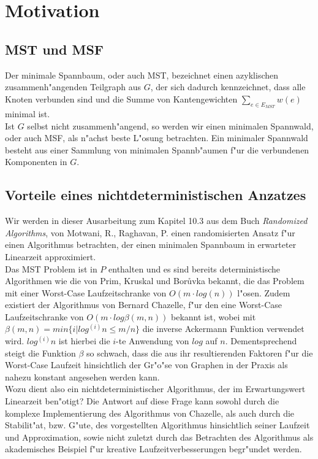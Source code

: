 \section{Motivation}

\subsection{MST und MSF}
Der minimale Spannbaum, oder auch MST, bezeichnet einen azyklischen 
    zusammenh"angenden Teilgraph aus $G$, der sich dadurch kennzeichnet, dass
    alle Knoten verbunden sind und
    die Summe von Kantengewichten $\sum_{e \in E_{MST}} w(e)$
    minimal ist.\\
Ist $G$ selbst nicht zusammenh"angend, so werden wir einen minimalen Spannwald,
    oder auch MSF,
    als n"achst beste L"osung betrachten.
    Ein minimaler Spannwald besteht aus einer Sammlung von minimalen 
    Spannb"aumen f"ur die verbundenen Komponenten in $G$.\\

\subsection{Vorteile eines nichtdeterministischen Anzatzes}

Wir werden in dieser Ausarbeitung zum Kapitel 10.3 aus dem Buch
    \textit{Randomized Algorithms}, von 
    Motwani, R., Raghavan, P.
    \cite{randAlg}
    einen
    randomisierten Ansatz f"ur einen Algorithmus betrachten, 
    der einen minimalen Spannbaum
    in erwarteter Linearzeit approximiert.\\
Das MST Problem ist in $P$ enthalten und es sind bereits 
    deterministische Algorithmen wie die von
    Prim, Kruskal und Bor\r uvka bekannt, 
    die das Problem mit einer Worst-Case Laufzeitschranke 
    von $O(m \cdot log(n))$ l"osen.
    Zudem existiert der Algorithmus von Bernard Chazelle, f"ur den eine
    Worst-Case Laufzeitschranke von $O(m \cdot log \beta(m,n))$ bekannt ist, wobei
    mit
    $\beta(m,n) = min\{i | log^{(i)} n \leq m / n\}$ die inverse Ackermann Funktion
    verwendet wird. 
    $log^{(i)} n$ ist hierbei die $i$-te Anwendung von $log$ auf $n$.
    Dementsprechend steigt die Funktion $\beta$ so schwach, dass die
    aus ihr resultierenden Faktoren f"ur die Worst-Case Laufzeit hinsichtlich
    der Gr"o"se von Graphen in der Praxis als nahezu konstant angesehen werden 
    kann.\\
Wozu dient also ein nichtdeterministischer Algorithmus, der im Erwartungswert 
    Linearzeit ben"otigt?
    Die Antwort auf diese Frage kann sowohl durch die komplexe Implementierung
    des Algorithmus von Chazelle, als auch durch die Stabilit"at, bzw. G"ute,
    des vorgestellten Algorithmus hinsichtlich seiner Laufzeit und Approximation,
    sowie nicht zuletzt durch das Betrachten des Algorithmus als akademisches
    Beispiel f"ur kreative Laufzeitverbesserungen begr"undet werden.\\
